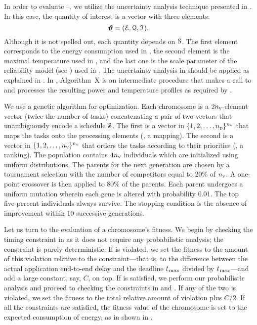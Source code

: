 In order to evaluate --, we utilize the uncertainty analysis technique presented in .
In this case, the quantity of interest is a vector with three elements:
\begin{equation} \elab{quantity-of-interest}
  \vw = (\qoiE, \qoiQ, \qoiT).
\end{equation}
Although it is not spelled out, each quantity depends on $\EuScript{S}$.
The first element corresponds to the energy consumption used in , the second element is the maximal temperature used in , and the last one is the scale parameter of the reliability model (see ) used in .
The uncertainty analysis in  should be applied as explained in .
In , Algorithm~X is an intermediate procedure that makes a call to  and processes the resulting power and temperature profiles as required by .

We use a genetic algorithm for optimization.
Each chromosome is a $2 {n_\text{v}}$-element vector (twice the number of tasks) concatenating a pair of two vectors that unambiguously encode a schedule $\EuScript{S}$.
The first is a vector in $\{ 1, 2, \dotsc, {n_\text{p}} \}^{n_\text{v}}$ that maps the tasks onto the processing elements (\ie, a mapping).
The second is a vector in $\{ 1, 2, \dotsc, {n_\text{v}} \}^{n_\text{v}}$ that orders the tasks according to their priorities (\ie, a ranking).
The population contains $4 {n_\text{v}}$ individuals which are initialized using uniform distributions.
The parents for the next generation are chosen by a tournament selection with the number of competitors equal to 20\% of ${n_\text{v}}$.
A one-point crossover is then applied to 80\% of the parents.
Each parent undergoes a uniform mutation wherein each gene is altered with probability 0.01.
The top five-percent individuals always survive.
The stopping condition is the absence of improvement within 10 successive generations.

Let us turn to the evaluation of a chromosome's fitness.
We begin by checking the timing constraint in  as it does not require any probabilistic analysis; the constraint is purely deterministic.
If  is violated, we set the fitness to the amount of this violation relative to the constraint---that is, to the difference between the actual application end-to-end delay and the deadline $t_{\text{\kern0.1emmax}}$ divided by $t_{\text{\kern0.1emmax}}$---and add a large constant, say, $C$, on top.
If  is satisfied, we perform our probabilistic analysis and proceed to checking the constraints in  and .
If any of the two is violated, we set the fitness to the total relative amount of violation plus $C/2$.
If all the constraints are satisfied, the fitness value of the chromosome is set to the expected consumption of energy, as in shown in .

